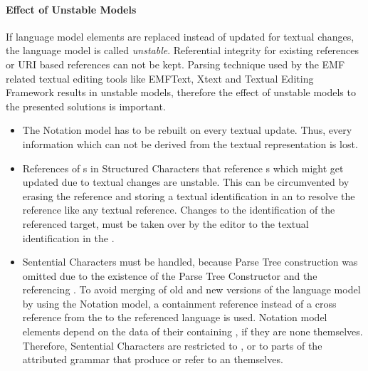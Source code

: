 \paragraph{Effect of Unstable Models}
If language model elements are replaced instead of updated for textual changes, the language model is called \emph{unstable}. Referential integrity for existing references or URI based references can not be kept. Parsing technique used by the EMF related textual editing tools like EMFText, Xtext and Textual Editing Framework results in unstable models, therefore the effect of unstable models to the presented solutions is important. 
\begin{itemize}
	\item The Notation model has to be rebuilt on every textual update. Thus, every information which can not be derived from the textual representation is lost.
	\item References of s in Structured Characters that reference s which might get updated due to textual changes are unstable. This can be circumvented by erasing the reference and storing a textual identification in an  to resolve the reference like any textual reference. Changes to the identification of the referenced target, must be taken over by the editor to the textual identification in the .
	\item Sentential Characters must be handled, because Parse Tree construction was omitted due to the existence of the Parse Tree Constructor and the referencing . To avoid merging of old and new versions of the language model by using the Notation model, a containment reference instead of a cross reference from the  to the referenced language  is used. Notation model elements depend on the data of their containing , if they are none themselves. Therefore, Sentential Characters are restricted to , or to parts of the attributed grammar that produce or refer to an  themselves. 
\end{itemize}

